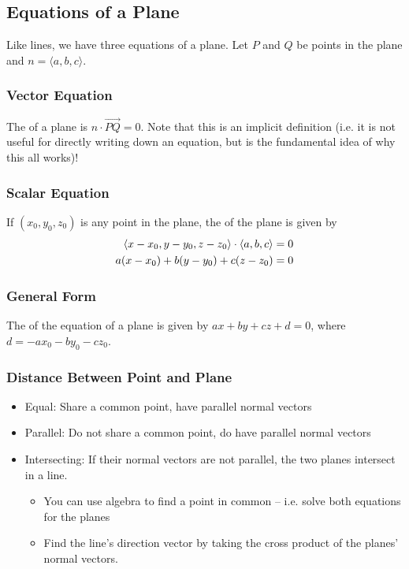 \subsection{Equations of a Plane}

Like lines, we have three equations of a plane. Let \(P\) and \(Q\) be points in the plane and \(n = \langle a,b,c \rangle\).

\subsubsection{Vector Equation}

The  of a plane is \(n \cdot \overrightarrow{PQ} = 0\). Note that this is an implicit definition (i.e. it is not useful for directly writing down an equation, but is the fundamental idea of why this all works)!

\subsubsection{Scalar Equation}

If \((x_{0},y_{0},z_{0})\) is any point in the plane, the  of the plane is given by
\begin{align*}
    \left\langle x - x_{0}, y - y_{0}, z - z_{0} \right\rangle \cdot \left\langle a,b,c \right\rangle &= 0 \\
    a(x - x_{0}) + b(y - y_{0}) + c(z - z_{0}) &= 0
\end{align*}

\subsubsection{General Form}

The  of the equation of a plane is given by \(ax + by + cz + d = 0\), where \(d = -ax_{0} - by_{0} - cz_{0}\).

\subsubsection{Distance Between Point and Plane}

\begin{itemize}
    \item Equal: Share a common point, have parallel normal vectors
    \item Parallel: Do not share a common point, do have parallel normal vectors
    \item Intersecting: If their normal vectors are not parallel, the two planes intersect in a line.
    \begin{itemize}
        \item You can use algebra to find a point in common -- i.e. solve both equations for the planes
        \item Find the line's direction vector by taking the cross product of the planes' normal vectors.
    \end{itemize}
\end{itemize}

